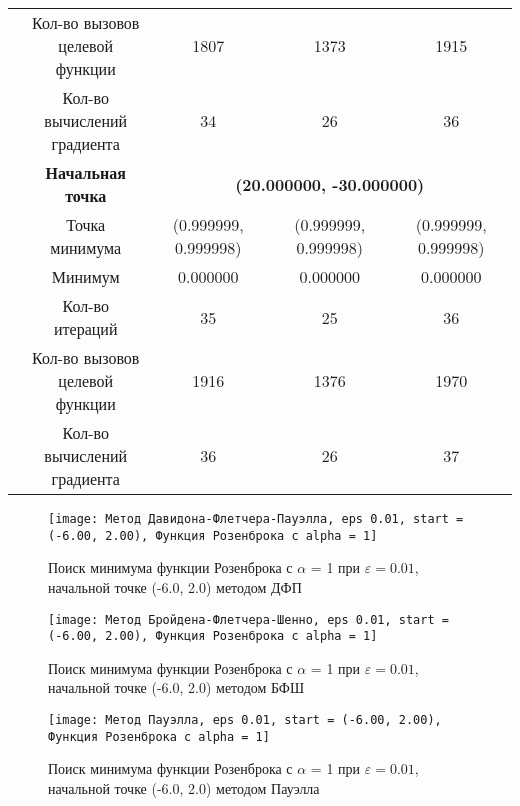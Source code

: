\begin{table}[H]
\begin{tabular}{|c|c|c|c|c|}
	\cline{2-5}
	&\makecell{Кол-во вызовов\\целевой функции} &1807 &1373 &1915 \\ 
	\cline{2-5}
	&\makecell{Кол-во вычислений\\градиента} &34 &26 &36 \\ 
	\cline{2-5}
\cline{2-5}&\textbf{Начальная точка} &\multicolumn{3}{c|}{\textbf{(20.000000, -30.000000)}}\\
	\cline{2-5}
	&Точка минимума &(0.999999, 0.999998) &(0.999999, 0.999998) &(0.999999, 0.999998) \\ 
	\cline{2-5}
	&Минимум &0.000000 &0.000000 &0.000000 \\ 
	\cline{2-5}
	&Кол-во итераций &35 &25 &36 \\ 
	\cline{2-5}
	&\makecell{Кол-во вызовов\\целевой функции} &1916 &1376 &1970 \\ 
	\cline{2-5}
	&\makecell{Кол-во вычислений\\градиента} &36 &26 &37 \\ 
	\cline{2-5}
	\hline

\end{tabular}
\end{table}


            \begin{figure}[H]
	        \centering
	        \texttt{[image: Метод Давидона-Флетчера-Пауэлла, eps 0.01, start = (-6.00, 2.00), Функция Розенброка с alpha = 1]}%
	        \caption{Поиск минимума функции Розенброка с $\alpha$ = 1 при $\varepsilon = 0.01$, начальной точке (-6.0, 2.0) методом ДФП}
	        \vspace*{-1.2cm}
            \end{figure}
            
            \begin{figure}[H]
	        \centering
	        \texttt{[image: Метод Бройдена-Флетчера-Шенно, eps 0.01, start = (-6.00, 2.00), Функция Розенброка с alpha = 1]}%
	        \caption{Поиск минимума функции Розенброка с $\alpha$ = 1 при $\varepsilon = 0.01$, начальной точке (-6.0, 2.0) методом БФШ}
	        \vspace*{-1.2cm}
            \end{figure}
            
            \begin{figure}[H]
	        \centering
	        \texttt{[image: Метод Пауэлла, eps 0.01, start = (-6.00, 2.00), Функция Розенброка с alpha = 1]}%
	        \caption{Поиск минимума функции Розенброка с $\alpha$ = 1 при $\varepsilon = 0.01$, начальной точке (-6.0, 2.0) методом Пауэлла}
	        \vspace*{-1.2cm}
            \end{figure}
            
